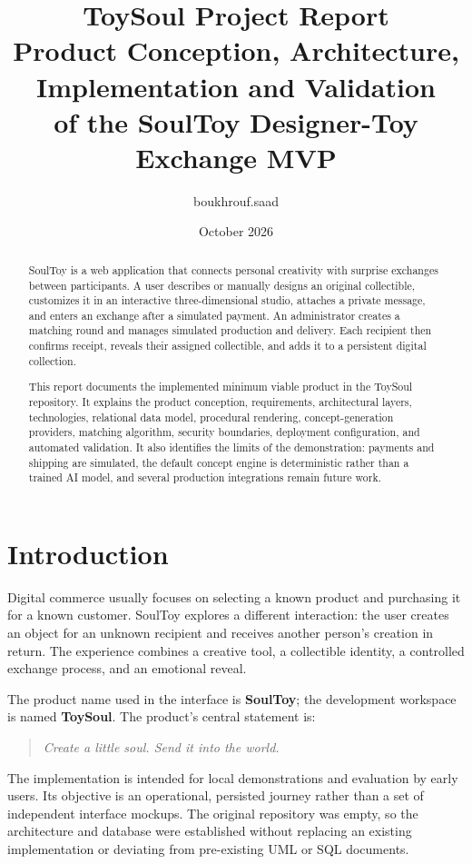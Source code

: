 \documentclass[11pt,a4paper]{article}
\title{ToySoul Project Report\\[0.5em]
\large Product Conception, Architecture, Implementation and Validation\\
of the SoulToy Designer-Toy Exchange MVP}
\author{boukhrouf.saad}
\date{October 2026}
\begin{document}
\maketitle

\begin{abstract}
SoulToy is a web application that connects personal creativity with surprise exchanges between participants. A user describes or manually designs an original collectible, customizes it in an interactive three-dimensional studio, attaches a private message, and enters an exchange after a simulated payment. An administrator creates a matching round and manages simulated production and delivery. Each recipient then confirms receipt, reveals their assigned collectible, and adds it to a persistent digital collection.

This report documents the implemented minimum viable product in the ToySoul repository. It explains the product conception, requirements, architectural layers, technologies, relational data model, procedural rendering, concept-generation providers, matching algorithm, security boundaries, deployment configuration, and automated validation. It also identifies the limits of the demonstration: payments and shipping are simulated, the default concept engine is deterministic rather than a trained AI model, and several production integrations remain future work.
\end{abstract}

\tableofcontents
\newpage

\section{Introduction}

Digital commerce usually focuses on selecting a known product and purchasing it for a known customer. SoulToy explores a different interaction: the user creates an object for an unknown recipient and receives another person's creation in return. The experience combines a creative tool, a collectible identity, a controlled exchange process, and an emotional reveal.

The product name used in the interface is \textbf{SoulToy}; the development workspace is named \textbf{ToySoul}. The product's central statement is:
\begin{quote}
\emph{Create a little soul. Send it into the world.}
\end{quote}

The implementation is intended for local demonstrations and evaluation by early users. Its objective is an operational, persisted journey rather than a set of independent interface mockups. The original repository was empty, so the architecture and database were established without replacing an existing implementation or deviating from pre-existing UML or SQL documents.
\end{document}
